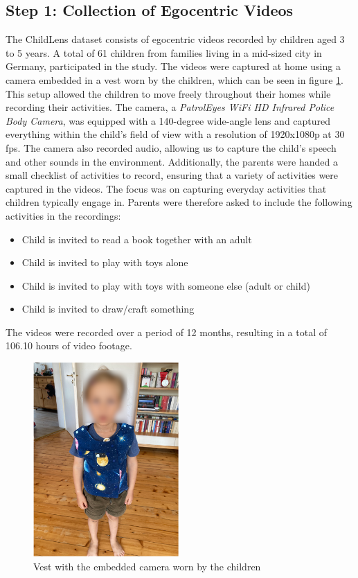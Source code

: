 \documentclass[
  man,floatsintext]{apa6}
\providecommand{\tightlist}{%
  \setlength{\itemsep}{0pt}\setlength{\parskip}{0pt}}
\begin{document}
\subsection{Step 1: Collection of Egocentric Videos}\label{step-1-collection-of-egocentric-videos}

The ChildLens dataset consists of egocentric videos recorded by children aged 3 to 5 years. A total of 61 children from families living in a mid-sized city in Germany, participated in the study. The videos were captured at home using a camera embedded in a vest worn by the children, which can be seen in figure \ref{fig:camera-worn}. This setup allowed the children to move freely throughout their homes while recording their activities. The camera, a \emph{PatrolEyes WiFi HD Infrared Police Body Camera}, was equipped with a 140-degree wide-angle lens and captured everything within the child's field of view with a resolution of 1920x1080p at 30 fps. The camera also recorded audio, allowing us to capture the child's speech and other sounds in the environment. Additionally, the parents were handed a small checklist of activities to record, ensuring that a variety of activities were captured in the videos. The focus was on capturing everyday activities that children typically engage in. Parents were therefore asked to include the following activities in the recordings:

\begin{itemize}
\tightlist
\item
  Child is invited to read a book together with an adult
\item
  Child is invited to play with toys alone
\item
  Child is invited to play with toys with someone else (adult or child)
\item
  Child is invited to draw/craft something
\end{itemize}

The videos were recorded over a period of 12 months, resulting in a total of 106.10 hours of video footage.

\begin{figure}

{\centering \includegraphics[width=2.19in]{camera_worn} 

}

\caption{Vest with the embedded camera worn by the children}\label{fig:camera-worn}
\end{figure}
\end{document}

